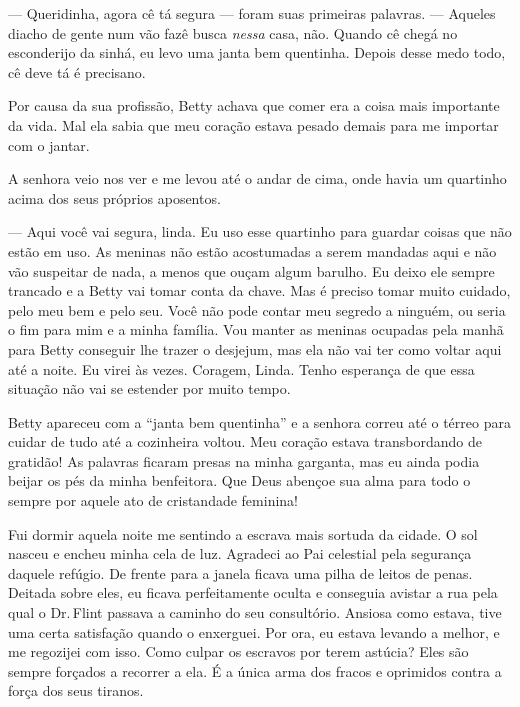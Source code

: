 --- Queridinha, agora cê tá segura --- foram suas primeiras palavras.
--- Aqueles diacho de gente num vão fazê busca \emph{nessa} casa, não.
Quando cê chegá no esconderijo da sinhá, eu levo uma janta bem
quentinha. Depois desse medo todo, cê deve tá é precisano.

Por causa da sua profissão, Betty achava que comer era a coisa mais
importante da vida. Mal ela sabia que meu coração estava pesado demais
para me importar com o jantar.

A senhora veio nos ver e me levou até o
andar de cima, onde havia um quartinho acima dos seus próprios
aposentos.

--- Aqui você vai segura, linda. Eu uso esse quartinho para guardar
coisas que não estão em uso. As meninas não estão acostumadas a serem
mandadas aqui e não vão suspeitar de nada, a menos que ouçam algum
barulho. Eu deixo ele sempre trancado e a Betty vai tomar conta da
chave. Mas é preciso tomar muito cuidado, pelo meu bem e pelo seu. Você
não pode contar meu segredo a ninguém, ou seria o fim para mim e a minha
família. Vou manter as meninas ocupadas pela manhã para Betty conseguir
lhe trazer o desjejum, mas ela não vai ter como voltar aqui até a noite.
Eu virei às vezes. Coragem, Linda. Tenho esperança de que essa situação
não vai se estender por muito tempo.

Betty apareceu com a ``janta bem quentinha'' e a senhora correu até o
térreo para cuidar de tudo até a cozinheira voltou. Meu coração estava
transbordando de gratidão! As palavras ficaram presas na minha garganta,
mas eu ainda podia beijar os pés da minha benfeitora. Que Deus abençoe
sua alma para todo o sempre por aquele ato de cristandade feminina!

Fui dormir aquela noite me sentindo a
escrava mais sortuda da cidade. O sol nasceu e encheu minha cela de luz.
Agradeci ao Pai celestial pela segurança daquele refúgio. De frente para
a janela ficava uma pilha de leitos de penas. Deitada sobre eles, eu
ficava perfeitamente oculta e conseguia avistar a rua pela qual o Dr.\,Flint passava a caminho do seu consultório. Ansiosa como estava, tive
uma certa satisfação quando o enxerguei. Por ora, eu estava levando a
melhor, e me regozijei com isso. Como culpar os escravos por terem
astúcia? Eles são sempre forçados a recorrer a ela. É a única arma dos
fracos e oprimidos contra a força dos seus tiranos.

